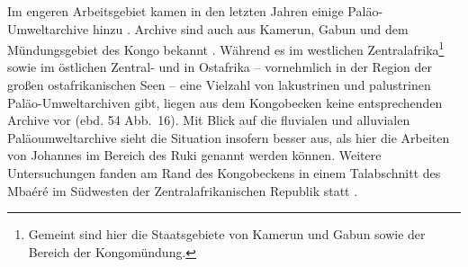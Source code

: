 \begin{multicols}{2}
Im engeren Arbeitsgebiet kamen in den letzten Jahren einige Paläo-Umweltarchive hinzu \parencites[siehe][]{Brncic.2007}{Brncic.2009}{Kiahtipes.2011}{Kiahtipes.2016}. Archive sind auch aus Kamerun, Gabun und dem Mündungsgebiet des Kongo bekannt \parencite[siehe][41--58; Abb.~\ref{fig:PalaeoumweltArch_Karte}]{Sangen.2009}. Während es im westlichen Zentralafrika\footnote{Gemeint sind hier die Staatsgebiete von Kamerun und Gabun sowie der Bereich der Kongomündung.} sowie im östlichen Zentral- und in Ostafrika -- vornehmlich in der Region der großen ostafrikanischen Seen -- eine Vielzahl von lakustrinen und palustrinen Paläo-Umweltarchiven gibt, liegen aus dem Kongobecken keine entsprechenden Archive vor (ebd. 54 Abb.~16). Mit Blick auf die fluvialen und alluvialen Paläoumweltarchive sieht die Situation insofern besser aus, als hier die Arbeiten von Johannes \textcites{Preu.1986}{Preu.1986b}{Preu.1990} im Bereich des Ruki genannt werden können. Weitere Untersuchungen fanden am Rand des Kongobeckens in einem Talabschnitt des Mbaéré im Südwesten der Zentralafrikanischen Republik statt \parencite{Neumer.2007}.


\end{multicols}
